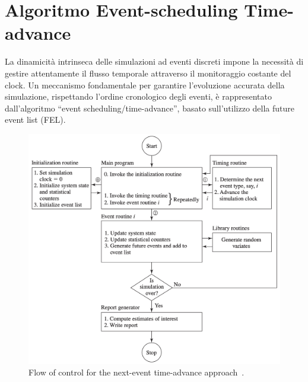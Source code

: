 \section{Algoritmo Event-scheduling Time-advance}
La dinamicità intrinseca delle simulazioni ad eventi discreti impone la necessità di gestire attentamente il flusso temporale attraverso il monitoraggio costante del clock. 
Un meccanismo fondamentale per garantire l'evoluzione accurata della simulazione, rispettando l'ordine cronologico degli eventi, è rappresentato dall'algoritmo ``event scheduling/time-advance'', basato sull'utilizzo  della future event list (FEL).

\begin{figure}
    \centering
    \includegraphics[width=.7\linewidth]{figures/discrete-event-simulation/time-advance-flow.png}
    \caption{Flow of control for the next-event time-advance approach~\cite{Law15}.}
    \label{fig:next-event-flow}
\end{figure}


